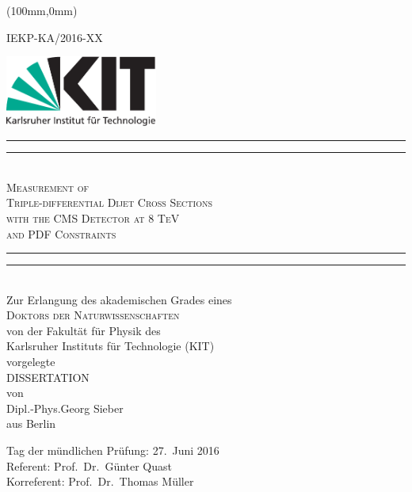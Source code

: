 \begin{titlepage}
    \begin{center}
        \begin{textblock*}{5cm}(100mm,0mm)
            \begin{flushright}
                \small
                IEKP-KA/2016-XX
            \end{flushright}
        \end{textblock*}
        \includegraphics[width=5.0cm]{figures/Kitlogo_de_cmyk}
        \vspace*{2cm}

        \vspace*{\baselineskip}
        \rule{\textwidth}{1.6pt}\vspace*{-\baselineskip}\vspace*{2pt}
        \rule{\textwidth}{0.4pt}\\[\baselineskip]
        \LARGE{\textsc{Measurement of\\
            Triple-differential Dijet Cross Sections\\
            with the CMS Detector at 8 TeV\\
            and PDF Constraints}}\\
        \rule{\textwidth}{0.4pt}\vspace*{-\baselineskip}\vspace{3.2pt}
        \rule{\textwidth}{1.6pt}\\[\baselineskip]
        \vspace{6ex}
        \large Zur Erlangung des akademischen Grades eines\\[2.5ex]
        \textsc{Doktors der Naturwissenschaften}\\[2.5ex]
            von der Fakult\"at f\"ur Physik des\\
        Karlsruher Instituts f\"ur Technologie (KIT)\\ 
        vorgelegte\\
        \vspace{2.5ex}
        DISSERTATION\\
        \vspace{2.5ex}
        von\\
        \vspace{2ex}
        Dipl.-Phys.\;Georg Sieber\\
        aus Berlin\\

    \end{center}
\vspace{\fill}
Tag der mündlichen Prüfung: 27.\ Juni 2016\\[1.5ex]
Referent: Prof.\ Dr.\ Günter Quast\\[0.5ex]
Korreferent: Prof.\ Dr.\ Thomas Müller

\end{titlepage}
\cleardoublepage
